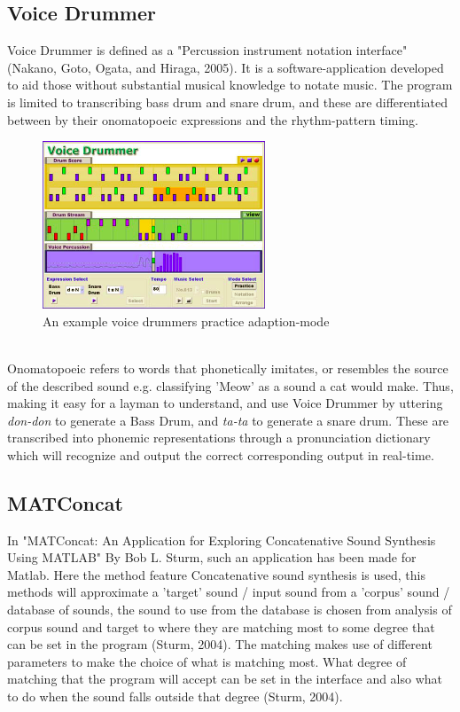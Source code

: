 \subsection{ Voice Drummer }
Voice Drummer is defined as a "Percussion instrument notation interface" (Nakano, Goto, Ogata, and Hiraga, 2005). It is a software-application developed to aid those without substantial musical knowledge to notate music. The program is limited to transcribing bass drum and snare drum, and these are differentiated between by their onomatopoeic expressions and the rhythm-pattern timing.
\\
\begin{figure}[h]
	\begin{center}
		\includegraphics[height=5cm]{fig/VoiceDrummer.png}
		\caption{An example voice drummers practice adaption-mode}
		\label{VoiceDrummer}
	\end{center}
\end{figure}
\\
Onomatopoeic refers to words that phonetically imitates, or resembles the source of the described sound e.g. classifying 'Meow' as a sound a cat would make. Thus, making it easy for a layman to understand, and use Voice Drummer by uttering \textit{don-don} to generate a Bass Drum, and \textit{ta-ta} to generate a snare drum. These are transcribed into phonemic representations through a pronunciation dictionary which will recognize and
 output the correct corresponding output in real-time.

\subsection{ MATConcat }
In "MATConcat: An Application for Exploring Concatenative Sound Synthesis Using MATLAB"  By Bob L. Sturm, such an application has been made for Matlab. Here the method feature Concatenative sound synthesis is used, this methods will approximate a 'target' sound / input sound from a 'corpus' sound / database of sounds, the sound to use from the database is chosen from analysis of corpus sound and target to where they are matching most to some degree that can be set in the program (Sturm, 2004). The matching makes use of different parameters to make the choice of what is matching most. What degree of matching that the program will accept can be set in the interface and also what to do when the sound falls outside that degree (Sturm, 2004).

